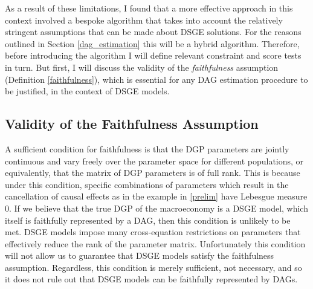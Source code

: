 \documentclass{article}
\begin{document}
As a result of these limitations, I found that a more effective approach in this context involved a bespoke algorithm that takes into account the relatively stringent assumptions that can be made about DSGE solutions. For the reasons outlined in Section \ref{dag_estimation} this will be a hybrid algorithm. Therefore, before introducing the algorithm I will define relevant constraint and score tests in turn. But first, I will discuss the validity of the \textit{faithfulness} assumption (Definition \ref{faithfulness}), which is essential for any DAG estimation procedure to be justified, in the context of DSGE models.

\subsection{Validity of the Faithfulness Assumption}

A sufficient condition for faithfulness is that the DGP parameters are jointly continuous and vary freely over the parameter space \parencite{steel2006homogeneity} for different populations, or equivalently, that the matrix of DGP parameters is of full rank. This is because under this condition, specific combinations of parameters which result in the cancellation of causal effects as in the example in \ref{prelim} have Lebesgue measure 0. If we believe that the true DGP of the macroeconomy is a DSGE model, which itself is faithfully represented by a DAG, then this condition is unlikely to be met. DSGE models impose many cross-equation restrictions on parameters that effectively reduce the rank of the parameter matrix. Unfortunately this condition will not allow us to guarantee that DSGE models satisfy the faithfulness assumption. Regardless, this condition is merely sufficient, not necessary, and so it does not rule out that DSGE models can be faithfully represented by DAGs. 
\end{document}
